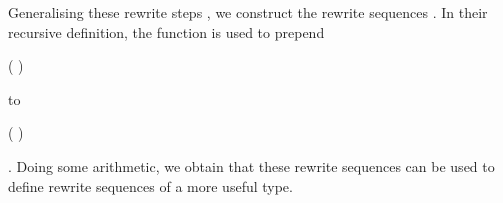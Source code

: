 Generalising these rewrite steps
, we construct
the rewrite sequences
. In their
recursive definition, the 
function is used to
prepend \begin{coqdoccode}(
 
)\end{coqdoccode} to
\begin{coqdoccode}(
 
)\end{coqdoccode}. Doing some arithmetic, we obtain
that these rewrite sequences can be used to define rewrite sequences
 of a more
useful type.
